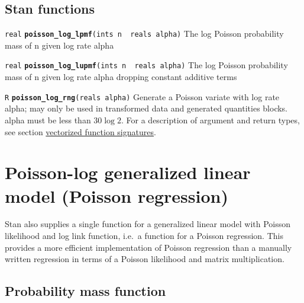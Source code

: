 \documentclass[
  10pt,
]{book}
\begin{document}
\hypertarget{stan-functions-17}{%
\subsection{Stan functions}\label{stan-functions-17}}


\texttt{real} \textbf{\texttt{poisson\_log\_lpmf}}\texttt{(ints\ n\ \textbar{}\ reals\ alpha)}\newline
The log Poisson probability mass of n given log rate alpha


\texttt{real} \textbf{\texttt{poisson\_log\_lupmf}}\texttt{(ints\ n\ \textbar{}\ reals\ alpha)}\newline
The log Poisson probability mass of n given log rate alpha dropping constant
additive terms


\texttt{R} \textbf{\texttt{poisson\_log\_rng}}\texttt{(reals\ alpha)}\newline
Generate a Poisson variate with log rate alpha; may only be used in
transformed data and generated quantities blocks. alpha must be less than
\(30 \log 2\). For a description of argument and return types, see section
\protect\hyperlink{prob-vectorization}{vectorized function signatures}.

\hypertarget{poisson-log-glm}{%
\section{Poisson-log generalized linear model (Poisson regression)}\label{poisson-log-glm}}

Stan also supplies a single function for a generalized linear model
with Poisson likelihood and log link function, i.e.~a function for a
Poisson regression. This provides a more efficient
implementation of Poisson regression than a manually written
regression in terms of a Poisson likelihood and matrix multiplication.

\hypertarget{probability-mass-function-15}{%
\subsection{Probability mass function}\label{probability-mass-function-15}}
\end{document}
